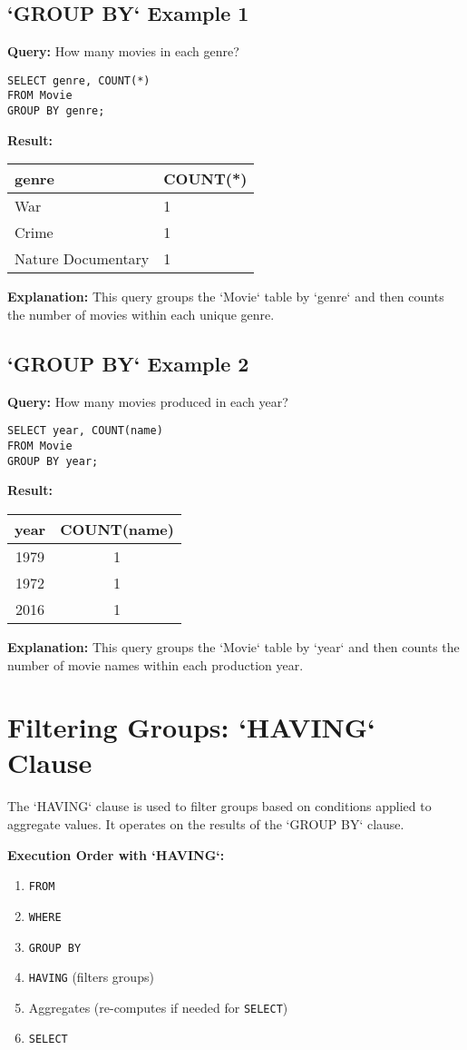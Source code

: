 \documentclass{article}
\begin{document}
\subsection*{`GROUP BY` Example 1}
\textbf{Query:} How many movies in each genre? 
\begin{lstlisting}
SELECT genre, COUNT(*)
FROM Movie
GROUP BY genre;
\end{lstlisting}
\textbf{Result:} 
\begin{tabular}{|l|l|}
    \hline
    \textbf{genre} & \textbf{COUNT(*)} \\
    \hline
    War & 1 \\
    Crime & 1 \\
    Nature Documentary & 1 \\
    \hline
\end{tabular}
\textbf{Explanation:} This query groups the `Movie` table by `genre` and then counts the number of movies within each unique genre.

\subsection*{`GROUP BY` Example 2}
\textbf{Query:} How many movies produced in each year? 
\begin{lstlisting}
SELECT year, COUNT(name)
FROM Movie
GROUP BY year;
\end{lstlisting}
\textbf{Result:} 
\begin{tabular}{|c|c|}
    \hline
    \textbf{year} & \textbf{COUNT(name)} \\
    \hline
    1979 & 1 \\
    1972 & 1 \\
    2016 & 1 \\
    \hline
\end{tabular}
\textbf{Explanation:} This query groups the `Movie` table by `year` and then counts the number of movie names within each production year.

\section*{Filtering Groups: `HAVING` Clause}
The `HAVING` clause is used to filter groups based on conditions applied to aggregate values.  It operates on the results of the `GROUP BY` clause. 

\textbf{Execution Order with `HAVING`:} 
\begin{enumerate}
    \item \texttt{FROM}
    \item \texttt{WHERE}
    \item \texttt{GROUP BY}
    \item \texttt{HAVING} (filters groups)
    \item Aggregates (re-computes if needed for \texttt{SELECT})
    \item \texttt{SELECT}
\end{enumerate}
\end{document}
